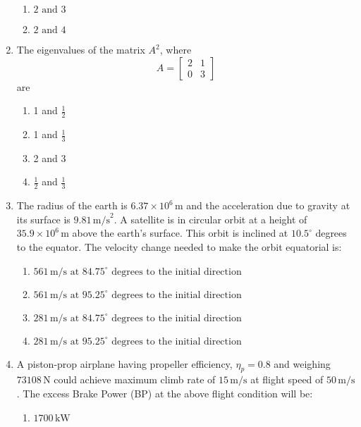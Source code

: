 \documentclass[journal]{IEEEtran}
\numberwithin{equation}{enumi}
\numberwithin{figure}{enumi}
\begin{document}
\begin{enumerate}
\begin{multicols}{4}
\begin{enumerate}
        \item $ \text{2 and 3} $
        \item $ \text{2 and 4} $
    \end{enumerate}
\end{multicols}
\bigskip
\item The eigenvalues of the matrix $A^2$, where \[A = \begin{bmatrix} 2 & 1 \\0 & 3\end{bmatrix}\]
are
\begin{multicols}{2}
    \begin{enumerate}
        \item 1 and $\frac{1}{2}$
        \item 1 and $\frac{1}{3}$
        \item 2 and 3
        \item $\frac{1}{2}$ and $\frac{1}{3}$
    \end{enumerate}
\end{multicols}
\bigskip
\item The radius of the earth is $6.37 \times 10^6 \, \text{m}$ and the acceleration due to gravity at its surface is $9.81 \, \text{m/s}^2$. A satellite is in circular orbit at a height of $35.9 \times 10^6 \, \text{m}$ above the earth's surface. This orbit is inclined at $10.5^\circ$ degrees to the equator. The velocity change needed to make the orbit equatorial is:
    \begin{enumerate}
        \item $561 \, \text{m/s at } 84.75^\circ \text{ degrees to the initial direction}$
        \item $561 \, \text{m/s at } 95.25^\circ \text{ degrees to the initial direction}$
        \item $281 \, \text{m/s at } 84.75^\circ \text{ degrees to the initial direction}$
        \item $281 \, \text{m/s at } 95.25^\circ \text{ degrees to the initial direction}$
    \end{enumerate}
\bigskip
\item A piston-prop airplane having propeller efficiency, $\eta_p = 0.8$ and weighing $73108 \, \text{N}$ could achieve maximum climb rate of $15 \, \text{m/s}$ at flight speed of $50 \, \text{m/s}$. The excess Brake Power (BP) at the above flight condition will be:
\begin{multicols}{2}
    \begin{enumerate}
        \item $1700 \, \text{kW}$

\end{enumerate}
\end{multicols}
\end{enumerate}
\end{document}
